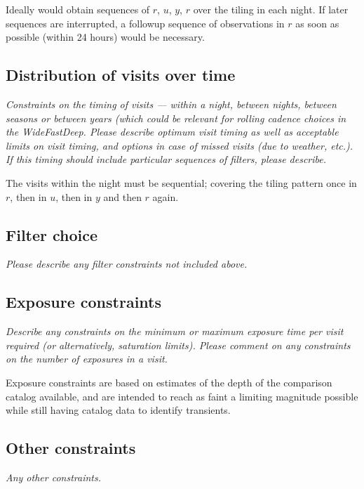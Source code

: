 \documentclass[12pt, letterpaper]{article}
\begin{document}
Ideally would obtain sequences of $r$, $u$, $y$, $r$ over the tiling in each night. If later sequences are interrupted, a
followup sequence of observations in $r$ as soon as possible (within 24 hours) would be necessary. 

\subsection{Distribution of visits over time}
\begin{footnotesize}{\it Constraints on the timing of visits --- within a night, between nights, between seasons or
between years (which could be relevant for rolling cadence choices in the WideFastDeep. 
Please describe optimum visit timing as well as acceptable limits on visit timing, and options in
case of missed visits (due to weather, etc.). If this timing should include particular sequences
of filters, please describe.}
\end{footnotesize}

The visits within the night must be sequential; covering the tiling pattern once in $r$, then in $u$, then in $y$ and then $r$ again.

\subsection{Filter choice}
\begin{footnotesize}
{\it Please describe any filter constraints not included above.}
\end{footnotesize}

\subsection{Exposure constraints}
\begin{footnotesize}
{\it Describe any constraints on the minimum or maximum exposure time per visit required (or alternatively, saturation limits).
Please comment on any constraints on the number of exposures in a visit.}
\end{footnotesize}

Exposure constraints are based on estimates of the depth of the comparison catalog available, and are intended to
reach as faint a limiting magnitude possible while still having catalog data to identify transients.

\subsection{Other constraints}
\begin{footnotesize}
{\it Any other constraints.}
\end{footnotesize}
\end{document}
